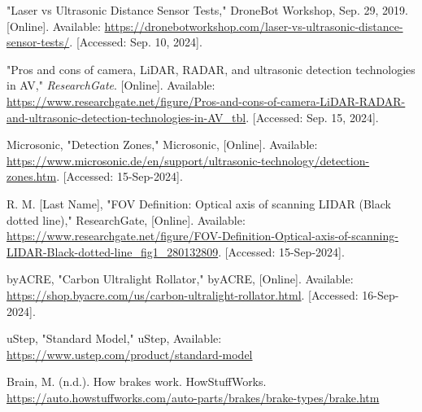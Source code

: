 \begin{thebibliography}{45}
	 "Laser vs Ultrasonic Distance Sensor Tests," DroneBot Workshop, Sep. 29, 2019. [Online]. Available: \href{https://dronebotworkshop.com/laser-vs-ultrasonic-distance-sensor-tests/}{https://dronebotworkshop.com/laser-vs-ultrasonic-distance-sensor-tests/}. [Accessed: Sep. 10, 2024].
	
	 "Pros and cons of camera, LiDAR, RADAR, and ultrasonic detection technologies in AV," \textit{ResearchGate}. [Online]. Available: \href{https://www.researchgate.net/figure/Pros-and-cons-of-camera-LiDAR-RADAR-and-ultrasonic-detection-technologies-in-AV\_tbl}{https://www.researchgate.net/figure/Pros-and-cons-of-camera-LiDAR-RADAR-and-ultrasonic-detection-technologies-in-AV\_tbl}. [Accessed: Sep. 15, 2024].
	
	 Microsonic, "Detection Zones," Microsonic, [Online]. Available: \href{https://www.microsonic.de/en/support/ultrasonic-technology/detection-zones.htm}{https://www.microsonic.de/en/support/ultrasonic-technology/detection-zones.htm}. [Accessed: 15-Sep-2024].
	
	 R. M. [Last Name], "FOV Definition: Optical axis of scanning LIDAR (Black dotted line)," ResearchGate, [Online]. Available: \href{https://www.researchgate.net/figure/FOV-Definition-Optical-axis-of-scanning-LIDAR-Black-dotted-line\_fig1\_280132809}{https://www.researchgate.net/figure/FOV-Definition-Optical-axis-of-scanning-LIDAR-Black-dotted-line\_fig1\_280132809}. [Accessed: 15-Sep-2024].
	
	 byACRE, "Carbon Ultralight Rollator," byACRE, [Online]. Available: \href{https://shop.byacre.com/us/carbon-ultralight-rollator.html}{https://shop.byacre.com/us/carbon-ultralight-rollator.html}. [Accessed: 16-Sep-2024].
	
	 uStep, "Standard Model," uStep, Available: \href{https://www.ustep.com/product/standard-model}{https://www.ustep.com/product/standard-model}
	
	 Brain, M. (n.d.). How brakes work. HowStuffWorks. \href{https://auto.howstuffworks.com/auto-parts/brakes/brake-types/brake.htm}{https://auto.howstuffworks.com/auto-parts/brakes/brake-types/brake.htm}
	

\end{thebibliography}
